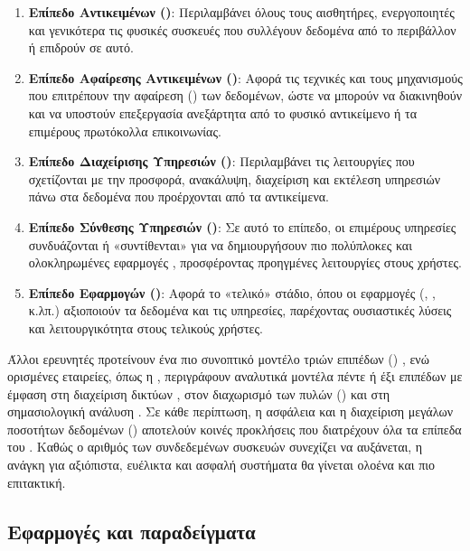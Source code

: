 \begin{enumerate}
  \item \textbf{Επίπεδο Αντικειμένων ()}: Περιλαμβάνει όλους τους αισθητήρες,
    ενεργοποιητές και γενικότερα τις φυσικές  συσκευές που συλλέγουν δεδομένα από το
    περιβάλλον ή επιδρούν σε αυτό.

  \item \textbf{Επίπεδο Αφαίρεσης Αντικειμένων ()}: Αφορά τις τεχνικές
    και τους μηχανισμούς που επιτρέπουν την αφαίρεση () των δεδομένων, ώστε
    να μπορούν να διακινηθούν και να υποστούν επεξεργασία ανεξάρτητα από το φυσικό αντικείμενο
    ή τα επιμέρους πρωτόκολλα επικοινωνίας.

  \item \textbf{Επίπεδο Διαχείρισης Υπηρεσιών ()}: Περιλαμβάνει τις
    λειτουργίες που σχετίζονται με την προσφορά, ανακάλυψη, διαχείριση και εκτέλεση υπηρεσιών
    πάνω στα δεδομένα που προέρχονται από τα αντικείμενα.

  \item \textbf{Επίπεδο Σύνθεσης Υπηρεσιών ()}: Σε αυτό το επίπεδο,
    οι επιμέρους υπηρεσίες συνδυάζονται ή «συντίθενται» για να δημιουργήσουν πιο πολύπλοκες
    και ολοκληρωμένες εφαρμογές , προσφέροντας προηγμένες λειτουργίες στους χρήστες.

  \item \textbf{Επίπεδο Εφαρμογών ()}: Αφορά το «τελικό» στάδιο, όπου οι
    εφαρμογές (, ,  κ.λπ.) αξιοποιούν τα δεδομένα
    και τις υπηρεσίες, παρέχοντας ουσιαστικές λύσεις και λειτουργικότητα στους τελικούς χρήστες.
\end{enumerate}

Άλλοι ερευνητές προτείνουν ένα πιο συνοπτικό μοντέλο τριών επιπέδων () \cite{gubbi_internet_2013}, ενώ ορισμένες εταιρείες, όπως η , περιγράφουν
αναλυτικά μοντέλα πέντε ή έξι επιπέδων με έμφαση στη διαχείριση δικτύων , στον
διαχωρισμό των πυλών () και στη σημασιολογική ανάλυση \cite{Cisco2014}. Σε κάθε
περίπτωση, η ασφάλεια και η διαχείριση μεγάλων ποσοτήτων δεδομένων () αποτελούν
κοινές προκλήσεις που διατρέχουν όλα τα επίπεδα του . Καθώς ο αριθμός των
συνδεδεμένων συσκευών συνεχίζει να αυξάνεται, η ανάγκη για αξιόπιστα, ευέλικτα και ασφαλή
συστήματα θα γίνεται ολοένα και πιο επιτακτική.

\subsection{Εφαρμογές και παραδείγματα}

